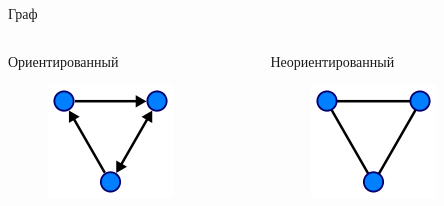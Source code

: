 \documentclass[newPxFont]{beamer}
\begin{document}
\begin{frame}{Граф}
\begin{columns}
	\begin{column}{.3\linewidth}
		Ориентированный
		\begin{figure}
		\centerline{\includegraphics[width=1.0\linewidth]{images/und_graph.png}}
		\end{figure}
	\end{column}
	\begin{column}{.3\linewidth}
		Неориентированный
		\begin{figure}
		\centerline{\includegraphics[width=1.0\linewidth]{images/d_graph.png}}
		\end{figure}
	\end{column}
\end{columns}
\end{frame}
\end{document}
